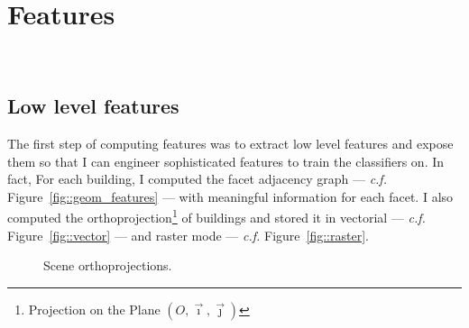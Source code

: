 \documentclass[a4paper, 11pt]{article}
\begin{document}
	\section{Features}
~\\

	\subsection{Low level features}


	The first step of computing features was to extract low level features and expose them so that I can engineer sophisticated features to train the classifiers on. In fact, For each building, I computed the facet adjacency graph --- \textit{c.f.} Figure~\ref{fig::geom_features} --- with meaningful information for each facet. I also computed the orthoprojection\footnote{Projection on the Plane $(O, \vec{\imath}, \vec{\jmath})$} of buildings and stored it in vectorial --- \textit{c.f.} Figure~\ref{fig::vector} --- and raster mode --- \textit{c.f.} Figure~\ref{fig::raster}.\\

	\begin{figure}[H]
		{
			\caption{\label{fig::orthoproj}Scene orthoprojections.}
		}
	\end{figure}
\end{document}
